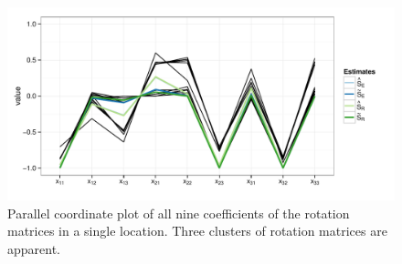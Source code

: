 {\begin{figure}[htbp] %
   \centering
   \includegraphics[width=.6\textwidth]{images/pcp.pdf} 
   \caption{ \label{fig:pcp}Parallel coordinate plot of all nine coefficients of the rotation matrices in a single location. Three clusters of rotation matrices are apparent.  }
\end{figure}

}

